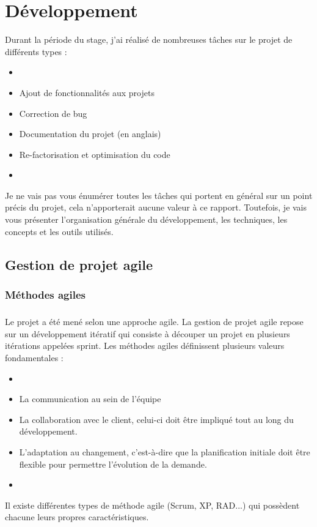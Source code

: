 \chapter{Développement}
Durant la période du stage, j'ai réalisé de nombreuses tâches sur le projet de différents types : 
\begin{itemize}
\item[]
\item Ajout de fonctionnalités aux projets
\item Correction de bug
\item Documentation du projet (en anglais)
\item Re-factorisation et optimisation du code
\item[]
\end{itemize}

Je ne vais pas vous énumérer toutes les tâches qui portent en général sur un point précis du projet,  cela n'apporterait aucune valeur à ce rapport. Toutefois, je vais vous présenter l'organisation générale du développement, les techniques, les concepts et les outils utilisés.

\section{Gestion de projet agile}
\subsection{Méthodes agiles}
\paragraph{}
Le projet a été mené selon une approche agile. La gestion de projet agile repose sur un développement itératif qui consiste à découper un projet en plusieurs itérations appelées sprint. Les méthodes agiles définissent plusieurs valeurs fondamentales : 

\begin{itemize}
         \item[]
\item La communication au sein de l'équipe
\item La collaboration avec le client, celui-ci doit être impliqué tout au long du développement.
\item L'adaptation au changement, c'est-à-dire que la planification initiale doit être flexible pour permettre l'évolution de la demande. 
         \item[]
\end{itemize}
Il existe différentes types de méthode agile (Scrum, XP, RAD...) qui possèdent chacune leurs propres caractéristiques.

